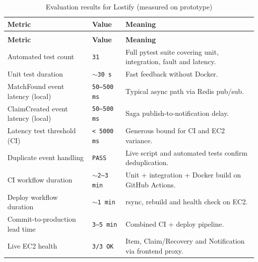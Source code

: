 \documentclass[11pt,a4paper]{article}
\begin{document}
\begingroup
\small
\renewcommand{\arraystretch}{1.4}
\setlength{\tabcolsep}{6pt}

\begin{longtable}{
@{}
>{\raggedright\arraybackslash}p{4.1cm}
>{\raggedright\arraybackslash}p{2.8cm}
>{\raggedright\arraybackslash}p{6.0cm}
@{}
}
\caption{Evaluation results for Lostify (measured on prototype)}
\label{tab:results} \\

\toprule
\textbf{Metric} & \textbf{Value} & \textbf{Meaning} \\
\midrule
\endfirsthead

\multicolumn{3}{c}{\tablename\ \thetable\ -- continued} \\
\toprule
\textbf{Metric} & \textbf{Value} & \textbf{Meaning} \\
\midrule
\endhead

Automated test count &
\texttt{31} &
Full pytest suite covering unit, integration, fault and latency. \\[0.6em]

Unit test duration &
\texttt{$\sim$30 s} &
Fast feedback without Docker. \\[0.6em]

MatchFound event latency (local) &
\texttt{50--500 ms} &
Typical async path via Redis pub/sub. \\[0.6em]

ClaimCreated event latency (local) &
\texttt{50--500 ms} &
Saga publish-to-notification delay. \\[0.6em]

Latency test threshold (CI) &
\texttt{< 5000 ms} &
Generous bound for CI and EC2 variance. \\[0.6em]

Duplicate event handling &
\texttt{PASS} &
Live script and automated tests confirm deduplication. \\[0.6em]

CI workflow duration &
\texttt{$\sim$2--3 min} &
Unit + integration + Docker build on GitHub Actions. \\[0.6em]

Deploy workflow duration &
\texttt{$\sim$1 min} &
rsync, rebuild and health check on EC2. \\[0.6em]

Commit-to-production lead time &
\texttt{3--5 min} &
Combined CI + deploy pipeline. \\[0.6em]

Live EC2 health &
\texttt{3/3 OK} &
Item, Claim/Recovery and Notification via frontend proxy. \\

\bottomrule
\end{longtable}
\endgroup
\end{document}
